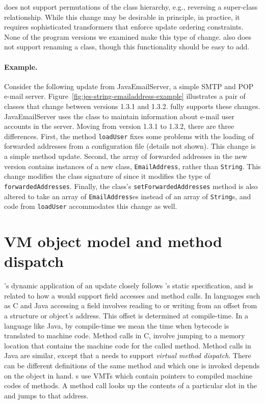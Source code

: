 \JV does not support permutations of the class hierarchy, e.g., reversing
a super-class relationship.  While this change may be desirable in
principle, in practice, it requires sophisticated transformers that enforce
update ordering constraints. None of the program versions we examined make
this type of change. \JV also does not support renaming a class, though
this functionality should be easy to add.


\paragraph{Example.} Consider the following update from JavaEmailServer, a
simple SMTP and POP e-mail server.
Figure~\ref{fig:jes-string-emailaddress-example} illustrates a pair of
classes that change between versions 1.3.1 and 1.3.2.  \JV fully supports
these changes. JavaEmailServer uses the class \User to maintain information
about e-mail user accounts in the server.  Moving from version 1.3.1 to
1.3.2, there are three differences. First, the method {\tt loadUser} fixes
some problems with the loading of forwarded addresses from a configuration
file (details not shown). This change is a simple method update.  Second,
the array of forwarded addresses in the new version contains instances of a
new class, {\tt EmailAddress}, rather than {\tt String}.  This change
modifies the class signature of \User since it modifies the type of {\tt
forwardedAddresses}. Finally, the class's {\tt setForwardedAddresses}
method is also altered to take an array of {\tt EmailAddress}es instead of
an array of {\tt String}s, and code from {\tt loadUser} accommodates this
change as well.

\section{VM object model and method dispatch}
\label{sec:dsu-view-of-changes}
\JV's dynamic application of an update closely follows \UPT's static specification, and
is related to how a
\JVM would support field accesses and method calls. In
languages such as C and Java accessing a field involves reading to or
writing from an offset from a structure or object's address. This offset is
determined at compile-time. In a language like Java, by compile-time we
mean the time when bytecode is translated to machine code. Method calls in
C, involve jumping to a memory location that contains the machine code for
the called method. Method calls in Java are similar, except that a \JVM
needs to support \emph{virtual method dispatch}. There can be different
definitions of the same method and which one is invoked depends on the
object in hand. \JVM{}s use \aclp{VMT} which contain pointers to compiled
machine codes of methods. A method call looks up the contents of a particular
slot in the \VMT and jumps to that address.

